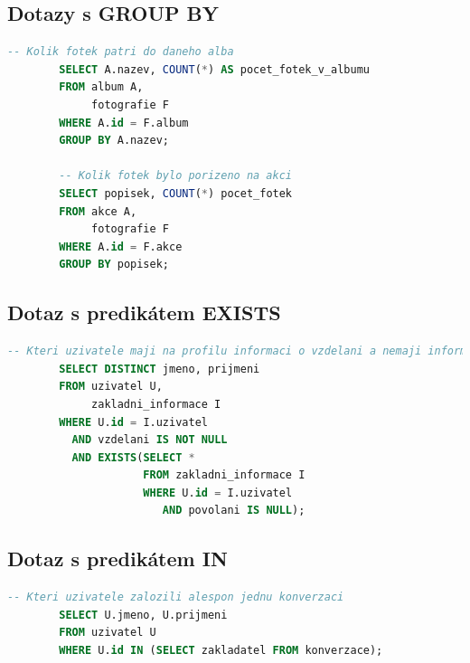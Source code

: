 \documentclass[11pt,a4paper]{article}
\begin{document}
\subsection{Dotazy s GROUP BY}
\begin{minipage}{\linewidth}
    \begin{center}
        \begin{lstlisting}[language=sql]
        -- Kolik fotek patri do daneho alba
        SELECT A.nazev, COUNT(*) AS pocet_fotek_v_albumu
        FROM album A,
             fotografie F
        WHERE A.id = F.album
        GROUP BY A.nazev;
        
        -- Kolik fotek bylo porizeno na akci
        SELECT popisek, COUNT(*) pocet_fotek
        FROM akce A,
             fotografie F
        WHERE A.id = F.akce
        GROUP BY popisek;\end{lstlisting}
    \end{center}
    
    \subsection{Dotaz s predikátem EXISTS}
    \begin{center}
        \begin{lstlisting}[language=sql]
        -- Kteri uzivatele maji na profilu informaci o vzdelani a nemaji informaci o povolani
        SELECT DISTINCT jmeno, prijmeni
        FROM uzivatel U,
             zakladni_informace I
        WHERE U.id = I.uzivatel
          AND vzdelani IS NOT NULL
          AND EXISTS(SELECT *
                     FROM zakladni_informace I
                     WHERE U.id = I.uzivatel
                        AND povolani IS NULL);\end{lstlisting}
    \end{center}
\end{minipage}

\subsection{Dotaz s predikátem IN}
\begin{minipage}{\linewidth}
    \begin{center}
        \begin{lstlisting}[language=sql]
        -- Kteri uzivatele zalozili alespon jednu konverzaci
        SELECT U.jmeno, U.prijmeni
        FROM uzivatel U
        WHERE U.id IN (SELECT zakladatel FROM konverzace);\end{lstlisting}  
    \end{center}
\end{minipage}
\end{document}
